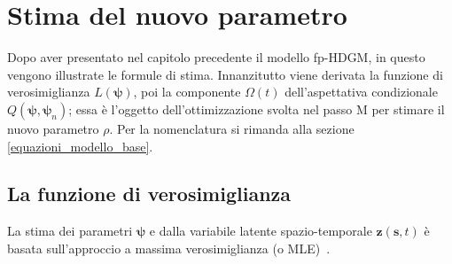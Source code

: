 \chapter[Stima del nuovo parametro]{Stima del nuovo parametro}

Dopo aver presentato nel capitolo precedente il modello fp-HDGM, in questo vengono illustrate le formule di stima. Innanzitutto viene derivata la funzione di verosimiglianza $L(\boldsymbol{\psi})$, poi la componente $\Omega(t)$ dell'aspettativa condizionale $Q(\boldsymbol{\psi}, \boldsymbol{\psi}_n)$; essa è l'oggetto dell'ottimizzazione svolta nel passo M per stimare il nuovo parametro $\rho$. Per la nomenclatura si rimanda alla sezione \ref{equazioni_modello_base}.

\section[La funzione di verosimiglianza]{La funzione di verosimiglianza}
La stima dei parametri $\boldsymbol{\psi}$ e dalla variabile latente spazio-temporale $\mathbf{z}(\mathbf{s}, t)$ è basata sull'approccio a massima verosimiglianza (o MLE)~\cite{paper_f_HDGM}.

